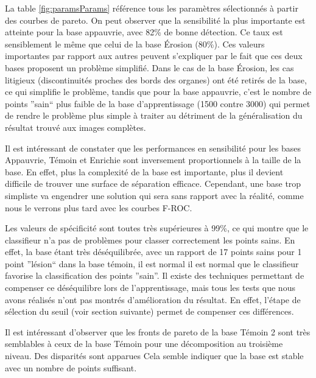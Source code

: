 La table \ref{fig:paramsParams} référence tous les paramètres sélectionnés à partir des courbes de pareto. On peut observer que la sensibilité la plus importante est atteinte pour la base appauvrie, avec 82\% de bonne détection. Ce taux est sensiblement le même que celui de la base Érosion (80\%). Ces valeurs importantes par rapport aux autres peuvent s'expliquer par le fait que ces deux bases proposent un problème simplifié. Dans le cas de la base Érosion, les cas litigieux (discontinuités proches des bords des organes) ont été retirés de la base, ce qui simplifie le problème, tandis que pour la base appauvrie, c'est le nombre de points ''sain`` plus faible de la base d'apprentissage (1500 contre 3000) qui permet de rendre le problème plus simple à traiter au détriment de la généralisation du résultat trouvé aux images complètes.

Il est intéressant de constater que les performances en sensibilité pour les bases Appauvrie, Témoin et Enrichie sont inversement proportionnels à la taille de la base. En effet, plus la complexité de la base est importante, plus il devient difficile de trouver une surface de séparation efficace. Cependant, une base trop simpliste va engendrer une solution qui sera sans rapport avec la réalité, comme nous le verrons plus tard avec les courbes F-ROC.

Les valeurs de spécificité sont toutes très supérieures à 99\%, ce qui montre que le classifieur n'a pas de problèmes pour classer correctement les points sains. En effet, la base étant très déséquilibrée, avec un rapport de 17 points sains pour 1 point ''lésion`` dans la base témoin, il est normal il est normal que le classifieur favorise la classification des points ''sain''. Il existe des techniques permettant de compenser ce déséquilibre lors de l'apprentissage, mais tous les tests que nous avons réalisés n'ont pas montrés d'amélioration du résultat. En effet, l'étape de sélection du seuil (voir section suivante) permet de compenser ces différences.

Il est intéressant d'observer que les fronts de pareto de la base Témoin 2 sont très semblables à ceux de la base Témoin pour une décomposition au troisième niveau. Des disparités sont apparues Cela semble indiquer que la base est stable avec un nombre de points suffisant.

